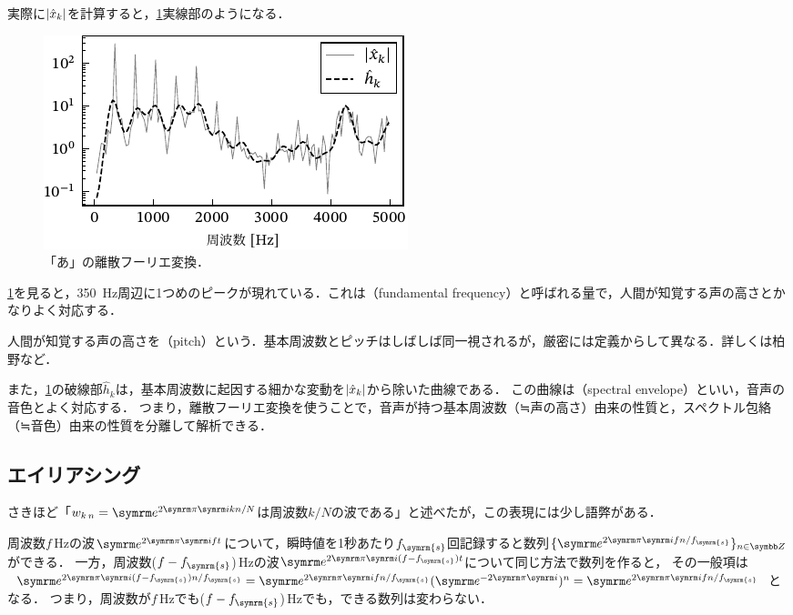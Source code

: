 \documentclass[../../main]{subfiles}
\begin{document}
実際に\(\lvert\hat{x}_k\rvert\)を計算すると，\cref{figure:frequency_domain}実線部のようになる．

\begin{figure}[htbp]
  \centering
  \includegraphics{figures/frequency_domain.pdf}
  \caption{「あ」の離散フーリエ変換．}
  \label{figure:frequency_domain}
\end{figure}

\cref{figure:frequency_domain}を見ると，\SI{350}{Hz}周辺に1つめのピークが現れている．これは（fundamental frequency）と呼ばれる量で，人間が知覚する声の高さとかなりよく対応する．

\begin{note}
  人間が知覚する声の高さを（pitch）という．基本周波数とピッチはしばしば同一視されるが，厳密には定義からして異なる．詳しくは柏野\cite{kashino}など．
\end{note}

また，\cref{figure:frequency_domain}の破線部\(\hat{h}_k\)は，基本周波数に起因する細かな変動を\(\lvert\hat{x}_k\rvert\)から除いた曲線である．
この曲線は（spectral envelope）といい，音声の音色とよく対応する．
つまり，離散フーリエ変換を使うことで，音声が持つ基本周波数（≒声の高さ）由来の性質と，スペクトル包絡（≒音色）由来の性質を分離して解析できる．

\subsection{エイリアシング}

さきほど「\(\midx{w}{k}{n}=\napr^{2\krez\iuni kn/N}\)は周波数\(k/N\)の波である」と述べたが，この表現には少し語弊がある．

周波数\(f\)\,\si{Hz}の波\(\napr^{2\krez\iuni ft}\)について，瞬時値を1秒あたり\(f_{\symrm{s}}\)回記録すると数列\(\seq{\napr^{2\krez\iuni fn/f_{\symrm{s}}}}_{n\in\numset{Z}}\)ができる．
一方，周波数(\(f-f_{\symrm{s}}\))\,\si{Hz}の波\(\napr^{2\krez\iuni(f-f_{\symrm{s}})t}\)について同じ方法で数列を作ると，
その一般項は\(\napr^{2\krez\iuni(f-f_{\symrm{s}})n/f_{\symrm{s}}}=\napr^{2\krez\iuni fn/f_{\symrm{s}}}(\napr^{-2\krez\iuni})^n=\napr^{2\krez\iuni fn/f_{\symrm{s}}}\)となる．
つまり，周波数が\(f\)\,\si{Hz}でも(\(f-f_{\symrm{s}}\))\,\si{Hz}でも，できる数列は変わらない．
\end{document}
